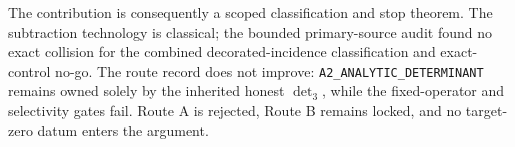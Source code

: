 The contribution is consequently a scoped classification and stop theorem.
The subtraction technology is classical; the bounded primary-source audit
found no exact collision for the combined decorated-incidence classification
and exact-control no-go.  The route record does not improve:
\texttt{A2\_ANALYTIC\_DETERMINANT} remains owned solely by the inherited
honest $\det_3$, while the fixed-operator and selectivity gates fail.
Route A is rejected, Route B remains locked, and no target-zero datum enters
the argument.
